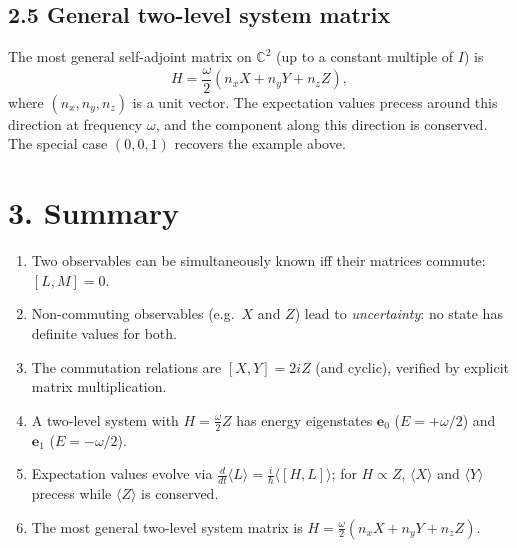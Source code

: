 \documentclass[12pt,a4paper]{article}
\begin{document}
\subsection{2.5 General two-level system matrix}
The most general self-adjoint matrix on $\mathbb{C}^2$ (up to a constant multiple of $I$) is
\[
    H = \frac{\omega}{2}(n_x X + n_y Y + n_z Z),
\]
where $(n_x,n_y,n_z)$ is a unit vector.  The expectation values precess around this direction at frequency $\omega$, and the component along this direction is conserved.  The special case $(0,0,1)$ recovers the example above.

\section{3. Summary}

\begin{enumerate}[nosep]
    \item Two observables can be simultaneously known iff their matrices commute: $[L,M]=0$.
    \item Non-commuting observables (e.g.\ $X$ and $Z$) lead to \emph{uncertainty}: no state has definite values for both.
    \item The commutation relations are $[X,Y]=2iZ$ (and cyclic), verified by explicit matrix multiplication.
    \item A two-level system with $H=\frac{\omega}{2}Z$ has energy eigenstates $\mathbf{e}_0$ ($E=+\omega/2$) and $\mathbf{e}_1$ ($E=-\omega/2$).
    \item Expectation values evolve via $\frac{d}{dt}\langle L \rangle = \frac{i}{\hbar}\langle [H,L] \rangle$; for $H \propto Z$, $\langle X \rangle$ and $\langle Y \rangle$ precess while $\langle Z \rangle$ is conserved.
    \item The most general two-level system matrix is $H=\frac{\omega}{2}(n_x X + n_y Y + n_z Z)$.
\end{enumerate}
\end{document}
